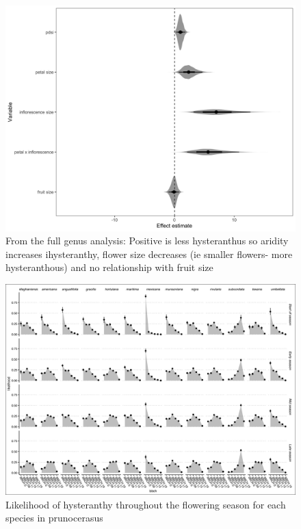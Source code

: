 \documentclass{article}\usepackage[]{graphicx}\usepackage[]{color}
\begin{document}
\begin{figure}[h!]
    \centering
 \includegraphics[width=\textwidth]{..//..//Plots/fullprunus_mus.jpeg}
    \caption{From the full genus analysis: Positive is less hysteranthus so aridity increases ihysteranthy, flower size decreases (ie smaller flowers- more hysteranthous) and no relationship with fruit size }
    \label{fig:cherries}
\end{figure}


\begin{figure}[h!]
    \centering
 \includegraphics[width=\textwidth]{..//..//Plots/ord_quants.jpeg}
    \caption{ Likelihood of hysteranthy throughout the flowering season for each species in prunocerasus}
    \label{fig:plums}
\end{figure}
\end{document}
